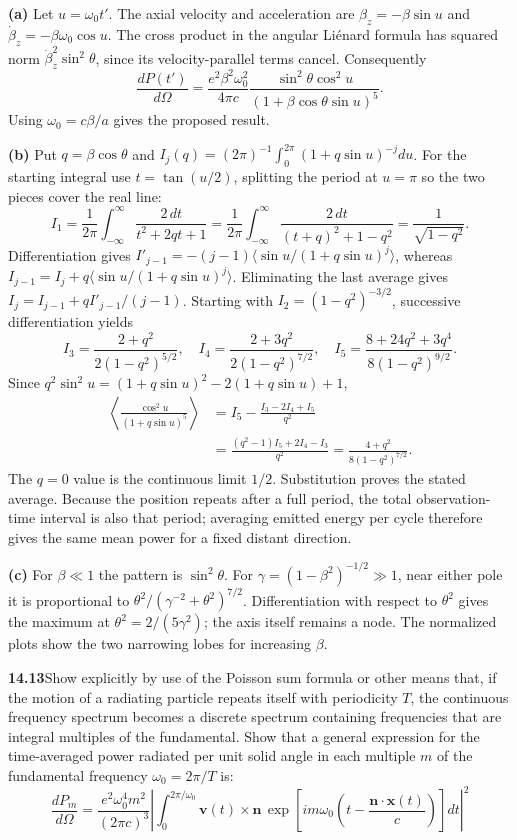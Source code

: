 \textbf{(a)} Let $u=\omega_0t'$. The axial velocity and acceleration are
$\beta_z=-\beta\sin u$ and $\dot\beta_z=-\beta\omega_0\cos u$.
The cross product in the angular Li\'enard formula has squared norm
$\dot\beta_z^2\sin^2\theta$, since its velocity-parallel terms cancel.
Consequently
\[
\frac{dP(t')}{d\Omega}
=\frac{e^2\beta^2\omega_0^2}{4\pi c}
\frac{\sin^2\theta\cos^2u}{(1+\beta\cos\theta\sin u)^5}.
\]
Using $\omega_0=c\beta/a$ gives the proposed result.

\textbf{(b)} Put $q=\beta\cos\theta$ and
$I_j(q)=(2\pi)^{-1}\int_0^{2\pi}(1+q\sin u)^{-j}du$.
For the starting integral use $t=\tan(u/2)$, splitting the period at
$u=\pi$ so the two pieces cover the real line:
\[
I_1=\frac1{2\pi}\int_{-\infty}^{\infty}
\frac{2\,dt}{t^2+2qt+1}
=\frac1{2\pi}\int_{-\infty}^{\infty}
\frac{2\,dt}{(t+q)^2+1-q^2}
=\frac1{\sqrt{1-q^2}}.
\]
Differentiation gives
$I'_{j-1}=-(j-1)\langle\sin u/(1+q\sin u)^j\rangle$,
whereas $I_{j-1}=I_j+
q\langle\sin u/(1+q\sin u)^j\rangle$.
Eliminating the last average gives
$I_j=I_{j-1}+qI'_{j-1}/(j-1)$.
Starting with $I_2=(1-q^2)^{-3/2}$, successive differentiation yields
\[
I_3=\frac{2+q^2}{2(1-q^2)^{5/2}},\quad
I_4=\frac{2+3q^2}{2(1-q^2)^{7/2}},\quad
I_5=\frac{8+24q^2+3q^4}{8(1-q^2)^{9/2}}.
\]
Since $q^2\sin^2u=(1+q\sin u)^2-2(1+q\sin u)+1$,
\begin{align*}
\left\langle\frac{\cos^2u}{(1+q\sin u)^5}\right\rangle
&=I_5-\frac{I_3-2I_4+I_5}{q^2}\\
&=\frac{(q^2-1)I_5+2I_4-I_3}{q^2}
=\frac{4+q^2}{8(1-q^2)^{7/2}}.
\end{align*}
The $q=0$ value is the continuous limit $1/2$.
Substitution proves the stated average. Because the position repeats
after a full period, the total observation-time interval is also that
period; averaging emitted energy per cycle therefore gives the same
mean power for a fixed distant direction.

\textbf{(c)} For $\beta\ll1$ the pattern is $\sin^2\theta$.
For $\gamma=(1-\beta^2)^{-1/2}\gg1$, near either pole it is proportional
to $\theta^2/(\gamma^{-2}+\theta^2)^{7/2}$. Differentiation with respect
to $\theta^2$ gives the maximum at
$\theta^2=2/(5\gamma^2)$; the axis itself remains a node.
The normalized plots show the two narrowing lobes for increasing $\beta$.
\begin{center}\end{center}

\par\bigskip
\noindent\textbf{14.13}\quad Show explicitly by use of the Poisson sum formula or other means that, if the motion of a radiating particle repeats itself with periodicity $T$, the continuous frequency spectrum becomes a discrete spectrum containing frequencies that are integral multiples of the fundamental. Show that a general expression for the time-averaged power radiated per unit solid angle in each multiple $m$ of the fundamental frequency $\omega_{0}=2\pi/T$ is:
\[
\frac{dP_{m}}{d\Omega}=\frac{e^{2}\omega_{0}^{4}m^{2}}{(2\pi c)^{3}}\left|\int_{0}^{2\pi/\omega_{0}}\mathbf{v}(t)\times\mathbf{n}\,\exp\!\left[im\omega_{0}\!\left(t-\frac{\mathbf{n}\cdot\mathbf{x}(t)}{c}\right)\right]dt\right|^{2}
\]
\solution

